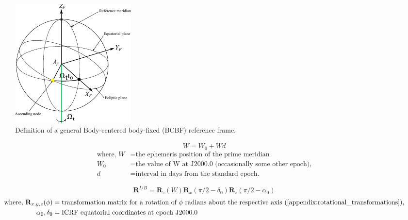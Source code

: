 \begin{figure}[H]
    \centering
    \includegraphics[width=0.35\linewidth]{graphics/bcbf.pdf}
    \caption{
        Definition of a general Body-centered body-fixed (BCBF) reference frame.
    }
    \label{fig:bci}
\end{figure}


\begin{equation}
    W = W_0 + \dot{W}d
    \label{eq:ephem_prime_meridian}
\end{equation}
\begin{equation*}
    \begin{aligned}
        \textrm{where, }
        W   & = \textrm{the ephemeris position of the prime meridian}               \\
        W_0 & = \textrm{the value of W at J2000.0 (occasionally some other epoch),} \\
        d   & = \textrm{interval in days from the standard epoch.}
    \end{aligned}
\end{equation*}

\begin{equation}
    \mathbf{R}^{I/B}=\mathbf{R}_z(W)\mathbf{R}_x(\pi/2-\delta_0)\mathbf{R}_z(\pi/2-\alpha_0)
    \label{eq:bci_transformation}
\end{equation}
\begin{equation*}
    \begin{aligned}
        \textrm{where, }
        \mathbf{R}_{x,y,z}(\phi) & = \textrm{transformation matrix for a rotation of $\phi$ radians about the respective axis (\autoref{appendix:rotational_transformations}),} \\
        \alpha_0, \delta_0       & = \textrm{ICRF equatorial coordinates at epoch J2000.0}                                                                                      \\
    \end{aligned}
\end{equation*}

